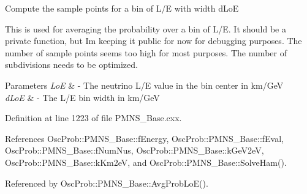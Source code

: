 Compute the sample points for a bin of L/E with width d\+LoE

This is used for averaging the probability over a bin of L/E. It should be a private function, but I\textquotesingle{}m keeping it public for now for debugging purposes. The number of sample points seems too high for most purposes. The number of subdivisions needs to be optimized.


\begin{DoxyParams}{Parameters}
{\em LoE} & -\/ The neutrino L/E value in the bin center in km/\+GeV \\
\hline
{\em d\+LoE} & -\/ The L/E bin width in km/\+GeV \\
\hline
\end{DoxyParams}


Definition at line 1223 of file P\+M\+N\+S\+\_\+\+Base.\+cxx.



References Osc\+Prob\+::\+P\+M\+N\+S\+\_\+\+Base\+::f\+Energy, Osc\+Prob\+::\+P\+M\+N\+S\+\_\+\+Base\+::f\+Eval, Osc\+Prob\+::\+P\+M\+N\+S\+\_\+\+Base\+::f\+Num\+Nus, Osc\+Prob\+::\+P\+M\+N\+S\+\_\+\+Base\+::k\+Ge\+V2eV, Osc\+Prob\+::\+P\+M\+N\+S\+\_\+\+Base\+::k\+Km2eV, and Osc\+Prob\+::\+P\+M\+N\+S\+\_\+\+Base\+::\+Solve\+Ham().



Referenced by Osc\+Prob\+::\+P\+M\+N\+S\+\_\+\+Base\+::\+Avg\+Prob\+Lo\+E().


